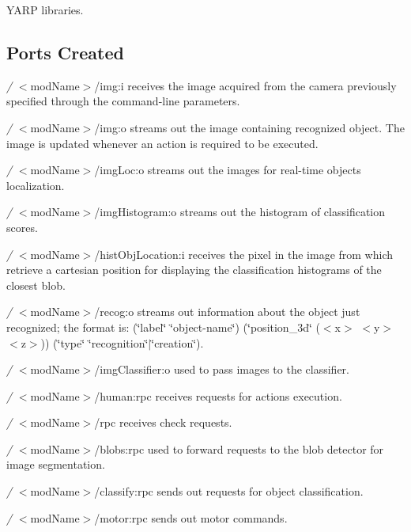 \begin{DoxyItemize}
\item Y\+A\+RP libraries.
\end{DoxyItemize}\hypertarget{group__icub__iolStateMachineHandler_portsc_sec}{}\subsection{Ports Created}\label{group__icub__iolStateMachineHandler_portsc_sec}

\begin{DoxyItemize}
\item {\itshape /} $<$mod\+Name$>$/img\+:i receives the image acquired from the camera previously specified through the command-\/line parameters.
\item {\itshape /} $<$mod\+Name$>$/img\+:o streams out the image containing recognized object. The image is updated whenever an action is required to be executed.
\item {\itshape /} $<$mod\+Name$>$/img\+Loc\+:o streams out the images for real-\/time objects localization.
\item {\itshape /} $<$mod\+Name$>$/img\+Histogram\+:o streams out the histogram of classification scores.
\item {\itshape /} $<$mod\+Name$>$/hist\+Obj\+Location\+:i receives the pixel in the image from which retrieve a cartesian position for displaying the classification histograms of the closest blob.
\item {\itshape /} $<$mod\+Name$>$/recog\+:o streams out information about the object just recognized; the format is\+: (\char`\"{}label\char`\"{} \char`\"{}object-\/name\char`\"{}) (\char`\"{}position\+\_\+3d\char`\"{} ($<$x$>$ $<$y$>$ $<$z$>$)) (\char`\"{}type\char`\"{} \char`\"{}recognition\char`\"{}$\vert$\char`\"{}creation\char`\"{}).
\item {\itshape /} $<$mod\+Name$>$/img\+Classifier\+:o used to pass images to the classifier.
\item {\itshape /} $<$mod\+Name$>$/human\+:rpc receives requests for actions execution.
\item {\itshape /} $<$mod\+Name$>$/rpc receives check requests.
\item {\itshape /} $<$mod\+Name$>$/blobs\+:rpc used to forward requests to the blob detector for image segmentation.
\item {\itshape /} $<$mod\+Name$>$/classify\+:rpc sends out requests for object classification.
\item {\itshape /} $<$mod\+Name$>$/motor\+:rpc sends out motor commands.

\end{DoxyItemize}
